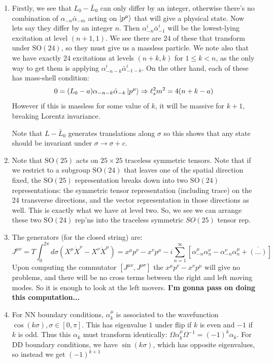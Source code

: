 \documentclass[11pt, class=article, crop=false]{standalone}
\begin{document}
\begin{enumerate}
	 \item Firstly, we see that $L_0 - \bar L_0$ can only differ by an integer, otherwise there's no combination of $\alpha_{-n} \bar \alpha_{-m}$ acting on $\ket{p^\mu}$ that will give a physical state. Now lets say they differ by an integer $n$. Then $\alpha_{-n}^i \bar \alpha_{-1}^i$ will be the lowest-lying excitation at level $(n+1, 1)$. We see there are $24$ of these that transform under $\mathrm{SO}(24)$, so they must give us a massless particle. We note also that we have exactly $24$ excitations at levels $(n+k, k)$ for $1 \leq k < n$, as the only way to get them is applying $\alpha_{-n-k}^i \bar \alpha_{-1-k}^i$. On the other hand, each of these has mass-shell condition:
	 \[
	 	0 = (L_0 - a) \alpha_{-n-k} \bar \alpha_{-k} \ket{p^\mu} \Rightarrow \ell_s^2 m^2 = 4 (n + k - a)
	 \]
	 However if this is massless for some value of $k$, it will be massive for $k+1$, breaking Lorentz invariance. 
	 
	 Note that $L - \bar L_0$ generates translations along $\sigma$ so this shows that any state should be invariant under $\sigma \to \sigma + c$.
	 
	 \item Note that $\mathrm{SO}(25)$ acts on $25 \times 25$ traceless symmetric tensors. Note that if we restrict to a subgroup $\mathrm{SO}(24)$ that leaves one of the spatial direction fixed, the $\mathrm{SO}(25)$ representation breaks down into two $\mathrm{SO}(24)$ representations: the symmetric tensor representation (including trace) on the 24 transverse directions, and the vector representation in those directions as well. This is exactly what we have at level two. So, we see we can arrange these two $\mathrm{SO}(24)$ rep'ns into the traceless symmetric $SO(25)$ tensor rep. 
	 
	 \item The generators (for the closed string) are:
	 \[
	 	J^{\mu \nu} = T \int_0^{2\pi} d\sigma (X^\mu \dot X^\nu - X^\nu \dot X^\mu) = x^\mu p^\nu - x^\nu p^\mu - i \sum_{n=1}^\infty [\alpha_{-n}^\mu \alpha^\nu_n - \alpha^\nu_{-n} \alpha^\mu_n + \overline{(\dots)} ]
	 \]
	 Upon computing the commutator $[J^{\mu \nu}, J^{\rho \sigma}]$ the $x^{ \mu} p^{\nu} - x^\nu p^\mu$ will give no problems, and there will be no cross terms between the right and left moving modes. So it is enough to look at the left movers.
	 \textbf{I'm gonna pass on doing this computation...}
	 
	 \item For NN boundary conditions, $\alpha_k^\mu$ is associated to the wavefunction $\cos(k \sigma), \sigma \in [0, \pi]$. This has eigenvalue $1$ under flip if $k$ is even and $-1$ if $k$ is odd. Thus this $\alpha_k$ must transform identically: $\Omega \alpha^\mu_k \Omega^{-1} = (-1)^k \alpha_k$. For DD boundary conditions, we have $\sin(k \sigma)$, which has opposite eigenvalues, so instead we get $(-1)^{k+1}$
	 

\end{enumerate}
\end{document}
